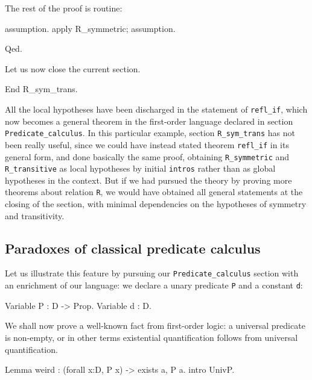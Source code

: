 \documentclass[11pt,a4paper]{book}
\begin{document}
The rest of the proof is routine:
\begin{coq_example}
assumption.
apply R_symmetric; assumption.
\end{coq_example}
\begin{coq_example*}
Qed.
\end{coq_example*}

Let us now close the current section.
\begin{coq_example}
End R_sym_trans.
\end{coq_example}

All the local hypotheses have been
discharged in the statement of \verb:refl_if:, which now becomes a general
theorem in the first-order language declared in section 
\verb:Predicate_calculus:. In this particular example, section
\verb:R_sym_trans: has not been really useful, since we could have
instead stated theorem \verb:refl_if: in its general form, and done 
basically the same proof, obtaining \verb:R_symmetric: and
\verb:R_transitive: as local hypotheses by initial \verb:intros: rather
than as global hypotheses in the context. But if we had pursued the
theory by proving more theorems about relation \verb:R:,
we would have obtained all general statements at the closing of the section,
with minimal dependencies on the hypotheses of symmetry and transitivity.

\subsection{Paradoxes of classical predicate calculus}

Let us illustrate this feature by pursuing our \verb:Predicate_calculus:
section with an enrichment of our language: we declare a unary predicate
\verb:P: and a constant \verb:d::
\begin{coq_example}
Variable P :  D -> Prop.
Variable d : D.
\end{coq_example}

We shall now prove a well-known fact from first-order logic: a universal 
predicate is non-empty, or in other terms existential quantification 
follows from universal quantification.
\begin{coq_example}
Lemma weird : (forall x:D, P x) ->  exists a, P a.
 intro UnivP.
\end{coq_example}
\end{document}
